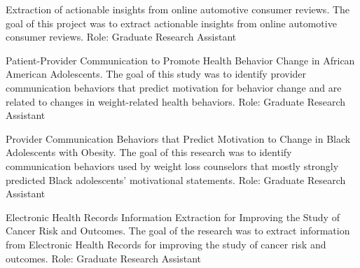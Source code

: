\documentclass{nihbiosketch}
\begin{document}
{Extraction of actionable insights from online automotive consumer reviews.}
{The goal of this project was to extract actionable insights from online automotive consumer reviews.}
{Role: Graduate Research Assistant}

\bigskip

{Patient-Provider Communication to Promote Health Behavior Change in African American Adolescents.}
{The goal of this study was to identify provider communication behaviors that predict motivation for behavior change and are related to changes in weight-related health behaviors.}
{Role: Graduate Research Assistant}

\bigskip

{Provider Communication Behaviors that Predict Motivation to Change in Black Adolescents with Obesity.}
{The goal of this research was to identify communication behaviors used by weight loss counselors that mostly strongly predicted Black adolescents’ motivational statements.}
{Role: Graduate Research Assistant}

\bigskip

{Electronic Health Records Information Extraction for Improving the Study of Cancer Risk and Outcomes.}
{The goal of the research was to extract information from Electronic Health Records for improving the study of cancer risk and outcomes.}
{Role: Graduate Research Assistant}
\end{document}
